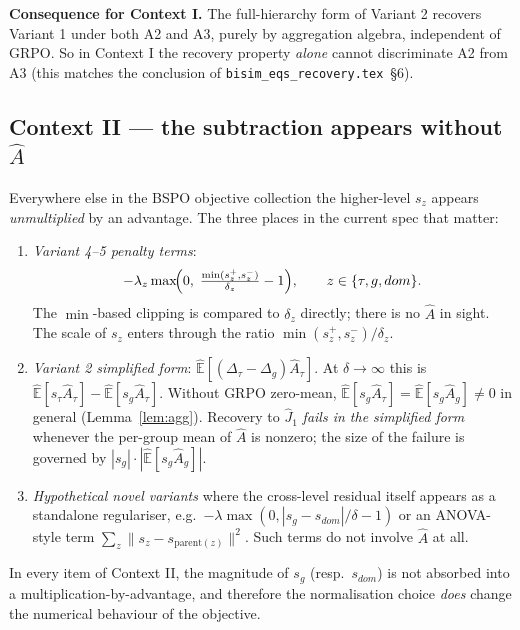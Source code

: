 \documentclass[11pt]{article}
\newcommand{\Ehat}{\widehat{\mathbb{E}}}
\begin{document}
\textbf{Consequence for Context I.} The full-hierarchy form of Variant 2
recovers Variant 1 under both A2 and A3, purely by aggregation algebra,
independent of GRPO. So in Context I the recovery property \emph{alone}
cannot discriminate A2 from A3 (this matches the conclusion of
\texttt{bisim\_eqs\_recovery.tex}~\S6).

\subsection*{Context II --- the subtraction appears without $\hat A$}

Everywhere else in the BSPO objective collection the higher-level $s_z$
appears \emph{unmultiplied} by an advantage. The three places in the
current spec that matter:

\begin{enumerate}
\item \emph{Variant 4--5 penalty terms}:
\[
-\lambda_z \max\!\Bigl(0,\;\tfrac{\min(s_z^+,s_z^-)}{\delta_z}-1\Bigr),
\qquad z\in\{\tau,g,dom\}.
\]
The $\min$-based clipping is compared to $\delta_z$ directly; there is no
$\hat A$ in sight. The scale of $s_z$ enters through the ratio
$\min(s_z^+,s_z^-)/\delta_z$.

\item \emph{Variant 2 simplified form}:
$\Ehat[(\Delta_\tau-\Delta_g)\hat A_\tau]$. At $\delta\to\infty$ this is
$\Ehat[s_\tau\hat A_\tau] - \Ehat[s_g\hat A_\tau]$. Without GRPO
zero-mean, $\Ehat[s_g\hat A_\tau] = \Ehat[s_g\hat A_g] \neq 0$ in general
(Lemma~\ref{lem:agg}). Recovery to $\hat J_1$ \emph{fails in the simplified
form} whenever the per-group mean of $\hat A$ is nonzero; the size of the
failure is governed by $|s_g|\cdot|\Ehat[s_g\hat A_g]|$.

\item \emph{Hypothetical novel variants} where the cross-level residual
itself appears as a standalone regulariser, e.g.\
$-\lambda\max(0, |s_g - s_{dom}|/\delta - 1)$ or an ANOVA-style term
$\sum_z \|s_z - s_{\text{parent}(z)}\|^2$. Such terms do not involve
$\hat A$ at all.
\end{enumerate}

In every item of Context II, the magnitude of $s_g$ (resp.\ $s_{dom}$) is
not absorbed into a multiplication-by-advantage, and therefore the
normalisation choice \emph{does} change the numerical behaviour of the
objective.
\end{document}
